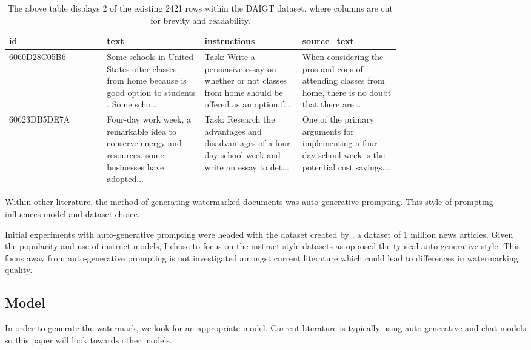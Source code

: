 \documentclass{l4proj}
\theoremstyle{definition}
\begin{document}
        \begin{table}[h]
            \centering
            \small 
            \begin{tabular}{@{}l|p{0.25\linewidth}|p{0.25\linewidth}|p{0.25\linewidth}@{}}
                \toprule
                id & text & instructions & source\_text \\ \midrule
                6060D28C05B6 & Some schools in United States ofter classes from home because is good option to students . Some scho... & Task: Write a persuasive essay on whether or not classes from home should be offered as an option f... & When considering the pros and cons of attending classes from home, there is no doubt that there are... \\ \cmidrule(r){1-4}
                60623DB5DE7A & Four-day work week, a remarkable idea to conserve energy and resources, some businesses have adopted... & Task: Research the advantages and disadvantages of a four-day school week and write an essay to det... & One of the primary arguments for implementing a four-day school week is the potential cost savings.... \\ \bottomrule
            \end{tabular}
            \captionsetup{width=.95\textwidth}
            \caption{The above table displays 2 of the existing 2421 rows within the DAIGT dataset, where columns are cut for brevity and readability.}
            \label{table:dataset-sample} 
        \end{table}

        Within other literature, the method of generating watermarked documents was auto-generative prompting. This style of prompting influences model and dataset choice.
    
        Initial experiments with auto-generative prompting were headed with the dataset created by \citet{Signal1M2016}, a dataset of 1 million news articles. 
        Given the popularity and use of instruct models, I chose to focus on the instruct-style datasets as opposed the typical auto-generative style. This focus away from auto-generative prompting is not investigated amongst current literature which could lead to differences in watermarking quality.
        
    \subsection{Model}
        In order to generate the watermark, we look for an appropriate model. Current literature is typically using auto-generative and chat models \citep{pang2024attacking, liu2024adaptive, kirchenbauer2023watermark, sadasivan2023aigenerated} so this paper will look towards other models.
\end{document}
